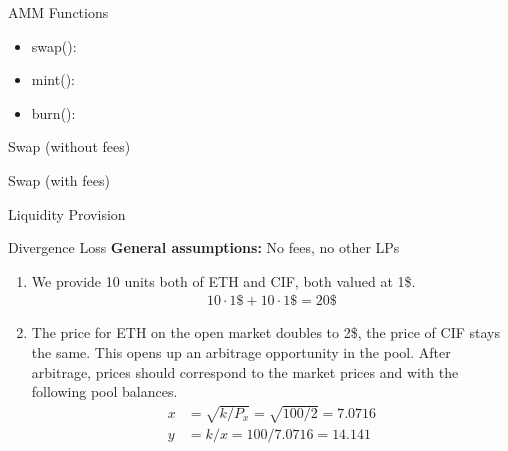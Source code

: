 \documentclass[]{beamer}
\begin{document}
\begin{frame}{AMM Functions}
	\begin{itemize}
		\item<1-> swap():
		\item<2-> mint():
		\item<3-> burn(): 
	\end{itemize}
\end{frame}

\begin{frame}{Swap (without fees)}
	\only<1>{
		\begin{figure}[h!]
			\begin{center}
				
			\end{center}
		\end{figure}
	}


\end{frame}


\begin{frame}{Swap (with fees)}
	
\end{frame}


\begin{frame}{Liquidity Provision}
	
\end{frame}


\begin{frame}{Divergence Loss}
		\textbf{General assumptions:} No fees, no other LPs \\ 
		
		\begin{enumerate}
			\item We provide 10 units both of ETH and CIF, both valued at 1\$.
			\begin{align*}
			10 \cdot 1\$ + 10 \cdot 1\$ = 20 \$	
			\end{align*}
			\item The price for ETH on the open market doubles to 2\$, the price of CIF stays the same. This opens up an arbitrage opportunity in the pool. After arbitrage, prices should correspond  to the market prices and with the following pool balances.
			\begin{align*}
			x &= \sqrt{k/P_{x}}	 = \sqrt{100/2} = 7.0716 \\
			y &= k / x = 100 / 7.0716 = 14.141
			\end{align*}
		\end{enumerate}
		
\end{frame}
\end{document}
